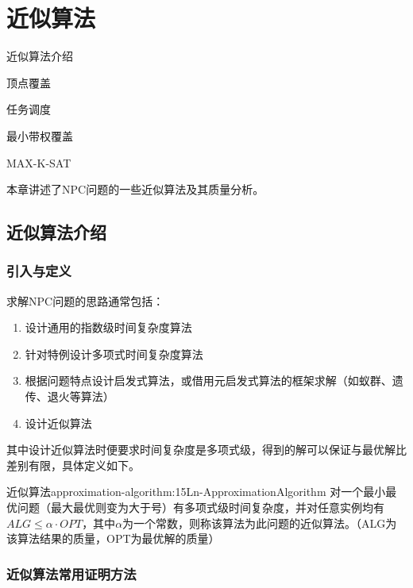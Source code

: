 \chapter{近似算法}

\begin{introduction}
	\item 近似算法介绍
	\item 顶点覆盖
	\item 任务调度
	\item 最小带权覆盖
	\item MAX-K-SAT
\end{introduction}

本章讲述了NPC问题的一些近似算法及其质量分析。

\section{近似算法介绍}

\subsection{引入与定义}

求解NPC问题的思路通常包括：
\begin{enumerate}
	\item 设计通用的指数级时间复杂度算法
	\item 针对特例设计多项式时间复杂度算法
	\item 根据问题特点设计启发式算法，或借用元启发式算法的框架求解（如蚁群、遗传、退火等算法）
	\item 设计近似算法
\end{enumerate}
其中设计近似算法时便要求时间复杂度是多项式级，得到的解可以保证与最优解比差别有限，具体定义如下。

\begin{definition}{近似算法}{approximation-algorithm:15Ln-ApproximationAlgorithm}
	对一个最小最优问题（最大最优则变为大于号）有多项式级时间复杂度，并对任意实例均有$ALG\leqslant \alpha \cdot OPT$，其中$\alpha$为一个常数，则称该算法为此问题的近似算法。（ALG为该算法结果的质量，OPT为最优解的质量）
\end{definition}

\subsection{近似算法常用证明方法}

